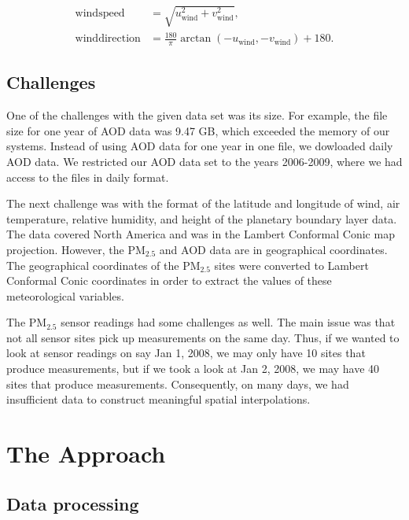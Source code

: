 \documentclass[10pt]{article}
\newcommand{\kelly}[1]{{\color{blue}{Kelly: {#1}}}}
\begin{document}
\[
\begin{aligned}
\text{windspeed} &= \sqrt{u_\text{wind}^2 + v_\text{wind}^2},\\
\text{winddirection} &= \displaystyle\frac{180}{\pi} \arctan(-u_\text{wind}, -v_\text{wind}) + 180.
\end{aligned}
\]

\subsection{Challenges}
One of the challenges with the given data set was its size. For example, the file size for one year of AOD data was 9.47 GB, which exceeded the memory of our systems. Instead of using AOD data for one year in one file, we dowloaded daily AOD data. We restricted our AOD data set to the years 2006-2009, where we had access to the files in daily format. %

The next challenge was with the format of the latitude and longitude of wind, air temperature, relative humidity, and height of the planetary boundary layer data. The data covered North America and was in the Lambert Conformal Conic map projection. However, the PM$_{2.5}$ and AOD data are in geographical coordinates. The geographical coordinates of the PM$_{2.5}$ sites were converted to Lambert Conformal Conic coordinates in order to extract the values of these meteorological variables. 

The PM$_{2.5}$ sensor readings had some challenges as well. The main issue was
that not all sensor sites pick up measurements on the same day. Thus, if we
wanted to look at sensor readings on say Jan 1, 2008, we may only have 10 sites
that produce measurements, but if we took a look at Jan 2, 2008, we may have 40
sites that produce measurements. Consequently, on many days, we had
insufficient data to construct meaningful spatial interpolations.





\section{The Approach}

\subsection{Data processing}
\end{document}
